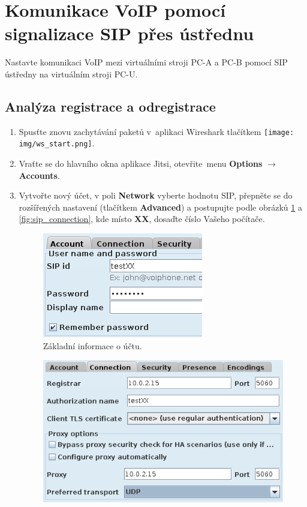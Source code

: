 \section{Komunikace VoIP pomocí signalizace SIP přes ústřednu}
Nastavte komunikaci VoIP mezi virtuálními stroji PC-A a PC-B pomocí SIP ústředny na virtuálním stroji PC-U.

\subsection{Analýza registrace a odregistrace}
\begin{enumerate}
    \item Spusťte znovu zachytávání paketů v aplikaci Wireshark tlačítkem \texttt{[image: img/ws\_start.png]}.
    \item Vraťte se do hlavního okna aplikace Jitsi, otevřite menu {\bf Options} $\rightarrow$ {\bf Accounts}.
    \item Vytvořte nový účet, v poli {\bf Network} vyberte hodnotu SIP, přepněte se do rozšířených nastavení (tlačítkem {\bf Advanced}) a postupujte podle obrázků \ref{fig:sip_account} a \ref{fig:sip_connection}, kde místo {\bf XX}, dosaďte číslo Vašeho počítače.\\
\begin{figure}[h!]
  \centering
  \includegraphics[scale=0.8]{img/sip_account.png}
  \caption{Základní informace o účtu.}
  \label{fig:sip_account}
\end{figure}
\begin{figure}[h!]
  \centering
  \includegraphics[scale=0.8]{img/sip_connection.png}

\end{figure}
\end{enumerate}
